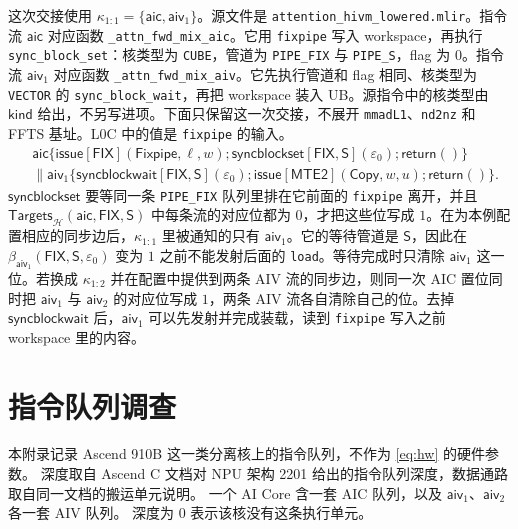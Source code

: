 \documentclass[UTF8,a4paper,11pt,fontset=fandol]{ctexart}
\newcommand{\kw}[1]{\ensuremath{\mathsf{#1}}}
\begin{document}
这次交接使用 $\kappa_{1:1}=\{\mathsf{aic},\mathsf{aiv}_1\}$。源文件是 \texttt{attention\_hivm\_lowered.mlir}。指令流 $\mathsf{aic}$ 对应函数 \texttt{\_attn\_fwd\_mix\_aic}。它用 \texttt{fixpipe} 写入 workspace，再执行 \texttt{sync\_block\_set}：核类型为 \texttt{CUBE}，管道为 \texttt{PIPE\_FIX} 与 \texttt{PIPE\_S}，flag 为 0。指令流 $\mathsf{aiv}_1$ 对应函数 \texttt{\_attn\_fwd\_mix\_aiv}。它先执行管道和 flag 相同、核类型为 \texttt{VECTOR} 的 \texttt{sync\_block\_wait}，再把 workspace 装入 UB。源指令中的核类型由 $\mathsf{kind}$ 给出，不另写进项。下面只保留这一次交接，不展开 \texttt{mmadL1}、\texttt{nd2nz} 和 FFTS 基址。L0C 中的值是 \texttt{fixpipe} 的输入。
\[
\begin{aligned}
&\mathsf{aic}\{
  \kw{issue}[\mathsf{FIX}](\kw{Fixpipe},\ell,w);
  \kw{syncblockset}[\mathsf{FIX},\mathsf{S}](\varepsilon_0);
  \kw{return}()\}\\
&\parallel
  \mathsf{aiv}_1\{
  \kw{syncblockwait}[\mathsf{FIX},\mathsf{S}](\varepsilon_0);
  \kw{issue}[\mathsf{MTE2}](\kw{Copy},w,u);
  \kw{return}()\}.
\end{aligned}
\]
$\kw{syncblockset}$ 要等同一条 \texttt{PIPE\_FIX} 队列里排在它前面的 \texttt{fixpipe} 离开，并且 $\mathsf{Targets}_{\mathcal H}(\mathsf{aic},\mathsf{FIX},\mathsf{S})$ 中每条流的对应位都为 $0$，才把这些位写成 $1$。在为本例配置相应的同步边后，$\kappa_{1:1}$ 里被通知的只有 $\mathsf{aiv}_1$。它的等待管道是 $\mathsf{S}$，因此在 $\beta_{\mathsf{aiv}_1}(\mathsf{FIX},\mathsf{S},\varepsilon_0)$ 变为 $1$ 之前不能发射后面的 \texttt{load}。等待完成时只清除 $\mathsf{aiv}_1$ 这一位。若换成 $\kappa_{1:2}$ 并在配置中提供到两条 AIV 流的同步边，则同一次 AIC 置位同时把 $\mathsf{aiv}_1$ 与 $\mathsf{aiv}_2$ 的对应位写成 $1$，两条 AIV 流各自清除自己的位。去掉 $\kw{syncblockwait}$ 后，$\mathsf{aiv}_1$ 可以先发射并完成装载，读到 \texttt{fixpipe} 写入之前 workspace 里的内容。

\appendix
\section{指令队列调查}
\label{app:queue-survey}

本附录记录 Ascend 910B 这一类分离核上的指令队列，不作为 \eqref{eq:hw} 的硬件参数。
深度取自 Ascend C 文档对 NPU 架构 2201 给出的指令队列深度，数据通路取自同一文档的搬运单元说明。
一个 AI Core 含一套 AIC 队列，以及 $\mathsf{aiv}_1$、$\mathsf{aiv}_2$ 各一套 AIV 队列。
深度为 $0$ 表示该核没有这条执行单元。
\end{document}
